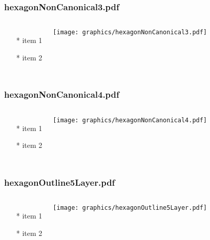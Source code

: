 \documentclass{beamer}
\begin{document}
\begin{frame} \frametitle{hexagonNonCanonical3.pdf}
    \begin{columns}[c]
        \begin{itemize}
            \item[*] item 1
            \item[*] item 2
        \end{itemize}
        \begin{minipage}{\linewidth}
            \begin{center}
            \texttt{[image: graphics/hexagonNonCanonical3.pdf]}
            \label{gfx:hexagonNonCanonical3.pdf}
            \end{center}
        \end{minipage}
    \end{columns}
\end{frame}
\begin{frame} \frametitle{hexagonNonCanonical4.pdf}
    \begin{columns}[c]
        \begin{itemize}
            \item[*] item 1
            \item[*] item 2
        \end{itemize}
        \begin{minipage}{\linewidth}
            \begin{center}
            \texttt{[image: graphics/hexagonNonCanonical4.pdf]}
            \label{gfx:hexagonNonCanonical4.pdf}
            \end{center}
        \end{minipage}
    \end{columns}
\end{frame}
\begin{frame} \frametitle{hexagonOutline5Layer.pdf}
    \begin{columns}[c]
        \begin{itemize}
            \item[*] item 1
            \item[*] item 2
        \end{itemize}
        \begin{minipage}{\linewidth}
            \begin{center}
            \texttt{[image: graphics/hexagonOutline5Layer.pdf]}
            \label{gfx:hexagonOutline5Layer.pdf}
            \end{center}
        \end{minipage}
    \end{columns}
\end{frame}
\end{document}
